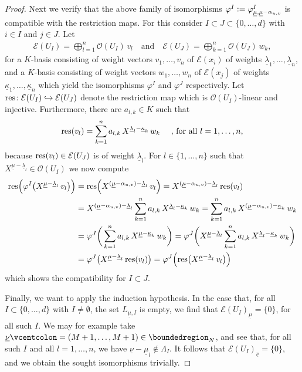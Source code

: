 \documentclass[a4paper, reqno, 10pt]{amsart}
\theoremstyle{definition}
\numberwithin{equation}{section}
\newcommand{\defeq}{\vcentcolon=}
\newcommand{\ul}[1]{{\underline{#1}}}
\newcommand{\CE}{{\mathcal {E}}}
\newcommand{\CO}{{\mathcal {O}}}
\begin{document}
\begin{proof}
	
	Next we verify that the above family of isomorphisms $\varphi^I \defeq \varphi^I_{\ul{\mu},\ul{\mu}-\alpha_{u,v}}$ is compatible with the restriction maps.
	For this consider $I\subset J \subset \{0,\ldots,d\}$ with $i\in I$ and $j\in J$.
	Let
	\begin{align*}
		\CE(U_I) = \bigoplus_{l=1}^n \CO (U_I) \,v_l \quad\text{and}\quad
		\CE(U_J) = \bigoplus_{k=1}^n \CO (U_J) \,w_k,
	\end{align*}
	for a $K$-basis consisting of weight vectors $v_1,\ldots,v_n$ of $\CE(x_i)$ of weights $\ul{\lambda}_1,\ldots,\ul{\lambda}_n$, and a $K$-basis consisting of weight vectors $w_1,\ldots,w_n$ of $\CE(x_j)$ of weights $\ul{\kappa}_1,\ldots,\ul{\kappa}_n$ which yield the isomorphisms $\varphi^I $ and $\varphi^J$ respectively.
	Let ${\rm res}\colon \CE(U_I) \hookrightarrow \CE(U_J)$ denote the restriction map which is $\CO(U_I)$-linear and injective.
	Furthermore, there are $a_{l,k} \in K$ such that
	\begin{equation*}
		{\rm res} (v_l) = \sum_{k=1}^n a_{l,k} \, X^{\ul{\lambda}_l - \ul{\kappa}_k} \, w_k \quad\text{ , for all $l=1,\ldots,n$,}
	\end{equation*}
	because ${\rm res} (v_l) \in \CE(U_J)$ is of weight $\ul{\lambda}_l$.
	For $l \in \{1,\ldots,n\}$ such that $X^{\ul{\mu}- \ul{\lambda}_l} \in \CO(U_I)$ we now compute
	\begin{align*}
		{\rm res} \Big( \varphi^I \big( X^{\ul{\mu}-\ul{\lambda}_l}\, v_l \big) \Big)
		&= {\rm res} \Big( X^{(\ul{\mu}-\alpha_{u,v})-\ul{\lambda}_l} \,v_l \Big) 
		= X^{(\ul{\mu}-\alpha_{u,v})-\ul{\lambda}_l} \,{\rm res} (v_l) \\
		&= X^{(\ul{\mu}-\alpha_{u,v})-\ul{\lambda}_l} \sum_{k=1}^n a_{l,k} \,X^{\ul{\lambda}_l - \ul{\kappa}_k} \, w_k 
		= \sum_{k=1}^n a_{l,k} \, X^{(\ul{\mu}-\alpha_{u,v}) - \ul{\kappa}_k} \, w_k \\
		&= \varphi^J \bigg( \sum_{k=1}^n a_{l,k} \, X^{\ul{\mu} - \ul{\kappa}_k} \, w_k \bigg)
		= \varphi^J \bigg( X^{\ul{\mu} - \ul{\lambda}_l} \sum_{k=1}^n a_{l,k}\,  X^{\ul{\lambda}_l - \ul{\kappa}_k} \, w_k \bigg) \\
		&= \varphi^J \big( X^{\ul{\mu} - \ul{\lambda}_l} \, {\rm res} ( v_l ) \big) 
		= \varphi^J \Big( {\rm res} \big( X^{\ul{\mu} - \ul{\lambda}_l} \, v_l \big) \Big) 
	\end{align*}
	which shows the compatibility for $I \subset J$.
	
	
	
	Finally, we want to apply the induction hypothesis.
	In the case that, for all $I \subset \{0,\ldots,d\}$ with $I\neq \emptyset$, the set $L_{\ul{\mu},I}$ is empty, we find that $\CE(U_I)_\ul{\mu} = \{0\}$, for all such $I$.
	We may for example take $\ul{\nu}\defeq (M+1,\ldots,M+1) \in \boundedregion_N$, and see that, for all such $I$ and all $l=1,\ldots,n$, we have $\ul{\nu}-\ul{\mu}_l \notin \Lambda_I$.
	It follows that $\CE(U_I)_\ul{\nu} = \{0\}$, and we obtain the sought isomorphisms trivially.
	

\end{proof}
\end{document}

